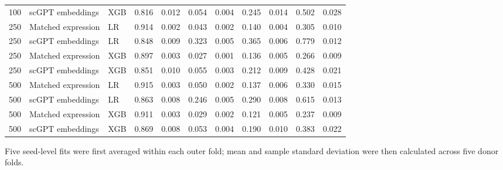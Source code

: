 \begin{landscape}
\begin{longtable}{rllcccccccc}
100 & scGPT embeddings & XGB & 0.816 & 0.012 & 0.054 & 0.004 & 0.245 & 0.014 & 0.502 & 0.028 \\
250 & Matched expression & LR & 0.914 & 0.002 & 0.043 & 0.002 & 0.140 & 0.004 & 0.305 & 0.010 \\
250 & scGPT embeddings & LR & 0.848 & 0.009 & 0.323 & 0.005 & 0.365 & 0.006 & 0.779 & 0.012 \\
250 & Matched expression & XGB & 0.897 & 0.003 & 0.027 & 0.001 & 0.136 & 0.005 & 0.266 & 0.009 \\
250 & scGPT embeddings & XGB & 0.851 & 0.010 & 0.055 & 0.003 & 0.212 & 0.009 & 0.428 & 0.021 \\
500 & Matched expression & LR & 0.915 & 0.003 & 0.050 & 0.002 & 0.137 & 0.006 & 0.330 & 0.015 \\
500 & scGPT embeddings & LR & 0.863 & 0.008 & 0.246 & 0.005 & 0.290 & 0.008 & 0.615 & 0.013 \\
500 & Matched expression & XGB & 0.911 & 0.003 & 0.029 & 0.002 & 0.121 & 0.005 & 0.237 & 0.009 \\
500 & scGPT embeddings & XGB & 0.869 & 0.008 & 0.053 & 0.004 & 0.190 & 0.010 & 0.383 & 0.022 \\
\end{longtable}
\noindent\footnotesize Five seed-level fits were first averaged within each outer fold; mean and sample standard deviation were then calculated across five donor folds.
\end{landscape}
